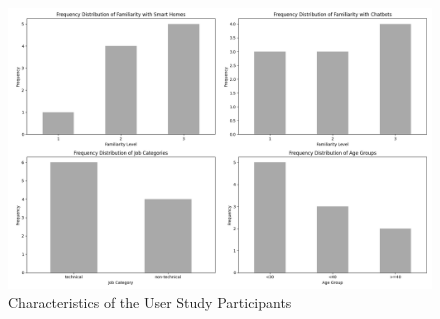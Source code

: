 \begin{figure}[h]
    \centering
    \captionsetup{justification=centering}
    \includegraphics[width=\textwidth]{graphics/participant-categories2.png}
    \caption{Characteristics of the User Study Participants}
    \label{fig:participants}
\end{figure}